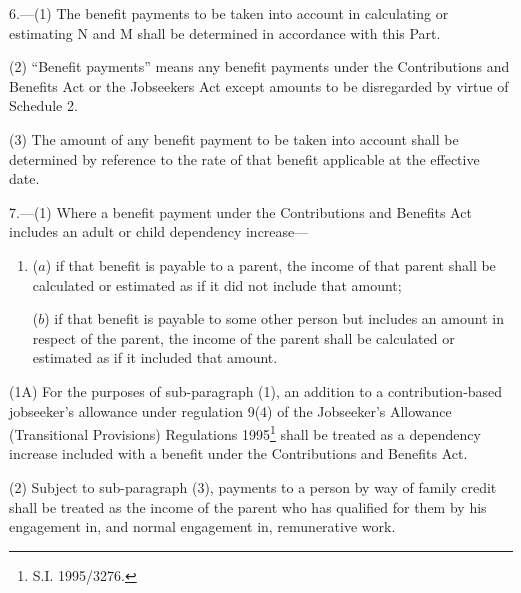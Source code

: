 \documentclass[12pt,a4paper]{article}
\begin{document}
\renewcommand\parthead{--- Schedule 1 Part II}

6.—(1) The benefit payments to be taken into account in calculating or estimating N and M shall be determined in accordance with this Part.

(2) “Benefit payments” means any benefit payments under the Contributions and Benefits Act 
or the Jobseekers Act  %
except amounts to be disregarded by virtue of Schedule 2.

(3) The amount of any benefit payment to be taken into account shall be determined by reference to the rate of that benefit applicable at the effective date.


\medskip

7.—(1) Where a benefit payment under the Contributions and Benefits Act includes an adult or child dependency increase—
\begin{enumerate}\item[]
($a$) if that benefit is payable to a parent, the income of that parent shall be calculated or estimated as if it did not include that amount;

($b$) if that benefit is payable to some other person but includes an amount in respect of the parent, the income of the parent shall be calculated or estimated as if it included that amount.
\end{enumerate}

\begin{sloppypar}
(1A) For the purposes of sub-paragraph (1), an addition to a contribution\hspace{0pt}-\hspace{0pt}based jobseeker’s allowance under regulation 9(4) of the Jobseeker’s Allowance (Transitional Provisions) Regulations 1995\footnote{\frenchspacing S.I. 1995/3276.} shall be treated as a dependency increase included with a benefit under the Contributions and Benefits Act.
\end{sloppypar}

(2) Subject to sub-paragraph (3), payments to a person by way of family credit shall be treated as the income of the parent who has qualified for them by his engagement in, and normal engagement in, remunerative work.
\end{document}
